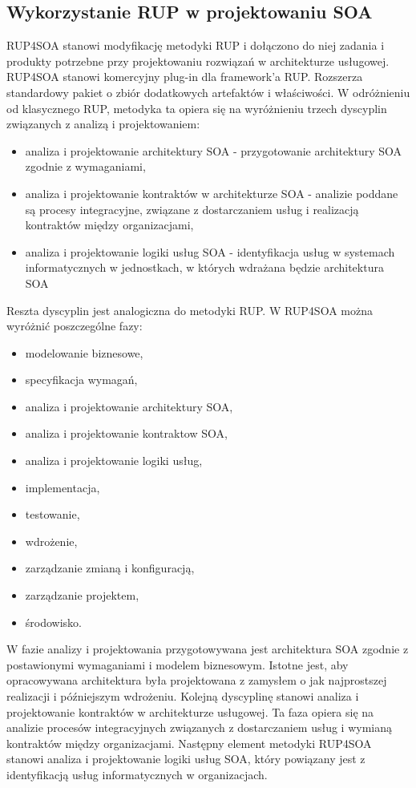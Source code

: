 \subsection{Wykorzystanie RUP w projektowaniu SOA}
RUP4SOA stanowi modyfikację metodyki RUP i dołączono do niej zadania i produkty potrzebne przy projektowaniu rozwiązań w architekturze usługowej. RUP4SOA stanowi komercyjny plug-in dla framework'a RUP. Rozszerza standardowy pakiet o zbiór dodatkowych artefaktów i właściwości. W odróżnieniu od klasycznego RUP, metodyka ta opiera się na wyróżnieniu trzech dyscyplin związanych z analizą i projektowaniem:
\begin{itemize}
\item{analiza i projektowanie architektury SOA - przygotowanie architektury SOA zgodnie z wymaganiami,}
\item{analiza i projektowanie kontraktów w architekturze SOA - analizie poddane są procesy integracyjne, związane z dostarczaniem usług i realizacją kontraktów między organizacjami,}
\item{analiza i projektowanie logiki usług SOA - identyfikacja usług w systemach informatycznych w jednostkach, w których wdrażana będzie architektura SOA}
\end{itemize}
Reszta dyscyplin jest analogiczna do metodyki RUP. \cite{PlatIntGor} W RUP4SOA można wyróżnić poszczególne fazy:
\begin{itemize}
\item {modelowanie biznesowe,}
\item {specyfikacja wymagań,}
\item {analiza i projektowanie architektury SOA,}
\item {analiza i projektowanie kontraktow SOA,}
\item {analiza i projektowanie logiki usług,}
\item {implementacja,}
\item {testowanie,}
\item {wdrożenie,}
\item {zarządzanie zmianą i konfiguracją,}
\item {zarządzanie projektem,}
\item {środowisko.}
\end{itemize}

W fazie analizy i projektowania przygotowywana jest architektura SOA zgodnie z postawionymi wymaganiami i modelem biznesowym. Istotne jest, aby opracowywana architektura była projektowana z zamysłem o jak najprostszej realizacji i późniejszym wdrożeniu. Kolejną dyscyplinę stanowi analiza i projektowanie kontraktów w architekturze usługowej. Ta faza opiera się na analizie procesów integracyjnych związanych z dostarczaniem usług i wymianą kontraktów między organizacjami. Następny element metodyki RUP4SOA stanowi analiza i projektowanie logiki usług SOA, który powiązany jest z identyfikacją usług informatycznych w organizacjach. 

